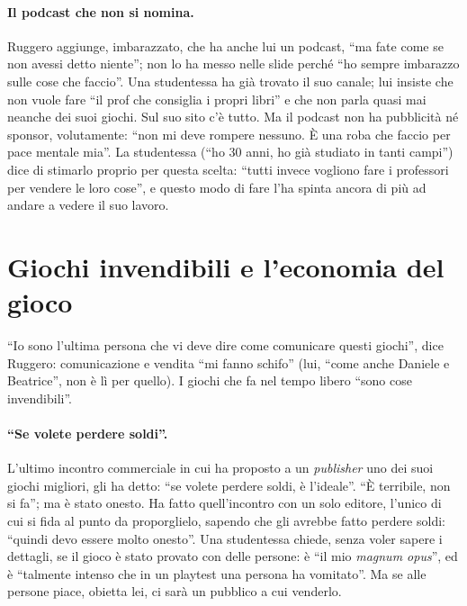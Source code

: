 \paragraph{Il podcast che non si nomina.} Ruggero aggiunge, imbarazzato, che ha anche
lui un podcast, ``ma fate come se non avessi detto niente''; non lo ha messo nelle slide
perché ``ho sempre imbarazzo sulle cose che faccio''. Una studentessa ha già trovato il
suo canale; lui insiste che non vuole fare ``il prof che consiglia i propri libri'' e
che non parla quasi mai neanche dei suoi giochi. Sul suo sito c'è tutto. Ma il podcast
non ha pubblicità né sponsor, volutamente: ``non mi deve rompere nessuno. È una roba che
faccio per pace mentale mia''. La studentessa (``ho 30 anni, ho già studiato in tanti
campi'') dice di stimarlo proprio per questa scelta: ``tutti invece vogliono fare i
professori per vendere le loro cose'', e questo modo di fare l'ha spinta ancora di più
ad andare a vedere il suo lavoro.

\section{Giochi invendibili e l'economia del gioco}
\label{a8:sec:mercato}

``Io sono l'ultima persona che vi deve dire come comunicare questi giochi'', dice
Ruggero: comunicazione e vendita ``mi fanno schifo'' (lui, ``come anche Daniele e
Beatrice'', non è lì per quello). I giochi che fa nel tempo libero ``sono cose
invendibili''.

\paragraph{``Se volete perdere soldi''.} L'ultimo incontro commerciale in cui ha
proposto a un \emph{publisher} uno dei suoi giochi migliori, gli ha detto: ``se volete
perdere soldi, è l'ideale''. ``È terribile, non si fa''; ma è stato onesto. Ha fatto
quell'incontro con un solo editore, l'unico di cui si fida al punto da proporglielo,
sapendo che gli avrebbe fatto perdere soldi: ``quindi devo essere molto onesto''. Una
studentessa chiede, senza voler sapere i dettagli, se il gioco è stato provato con delle
persone: è ``il mio \emph{magnum opus}'', ed è ``talmente intenso che in un playtest
una persona ha vomitato''. Ma se alle persone piace, obietta lei, ci sarà un pubblico a
cui venderlo.

